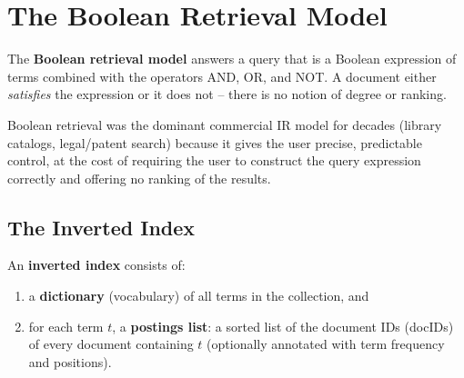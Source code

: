 \documentclass[11pt, a4paper]{article}
\begin{document}
\section{The Boolean Retrieval Model}

\begin{defbox}
The \textbf{Boolean retrieval model} answers a query that is a Boolean expression of terms combined with the operators \textsf{AND}, \textsf{OR}, and \textsf{NOT}. A document either \emph{satisfies} the expression or it does not -- there is no notion of degree or ranking.
\end{defbox}

Boolean retrieval was the dominant commercial IR model for decades (library catalogs, legal/patent search) because it gives the user precise, predictable control, at the cost of requiring the user to construct the query expression correctly and offering no ranking of the results.

\subsection{The Inverted Index}
\label{sec:inverted-index}

\begin{defbox}
An \textbf{inverted index} consists of:
\begin{enumerate}
  \item a \textbf{dictionary} (vocabulary) of all terms in the collection, and
  \item for each term $t$, a \textbf{postings list}: a sorted list of the document IDs (docIDs) of every document containing $t$ (optionally annotated with term frequency and positions).
\end{enumerate}
\end{defbox}
\end{document}
